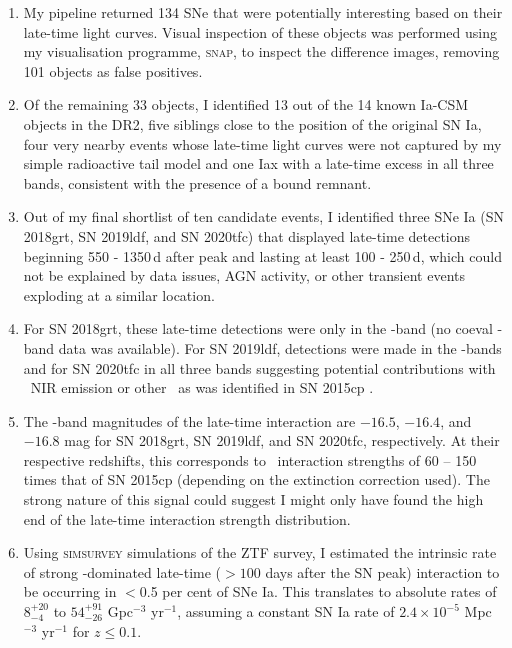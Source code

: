\documentclass[a4paper,oneside,12pt, class=Latex/Classes/PhDthesisPSnPDF, crop=false]{standalone}
\begin{document}
\begin{enumerate}
 \item My pipeline returned 134 SNe that were potentially interesting based on their late-time light curves. Visual inspection of these objects was performed using my visualisation programme, \textsc{snap}, to inspect the difference images, removing 101 objects as false positives. 
 \item Of the remaining 33 objects, I identified 13 out of the 14 known Ia-CSM objects in the DR2, five siblings close to the position of the original SN Ia, four very nearby events whose late-time light curves were not captured by my simple radioactive tail model and one Iax with a late-time excess in all three bands, consistent with the presence of a bound remnant. 
 \item Out of my final shortlist of ten candidate events, I identified three SNe Ia (SN 2018grt, SN 2019ldf, and SN 2020tfc) that displayed late-time detections beginning 550 - 1350\,d after peak and lasting at least 100 - 250\,d, which could not be explained by data issues, AGN activity, or other transient events exploding at a similar location. 
 \item For SN 2018grt, these late-time detections were only in the \ztfr-band (no coeval \ztfi-band data was available). For SN 2019ldf, detections were made in the \ztfr\ztfi-bands and for SN 2020tfc in all three bands suggesting potential contributions with \CaII\ NIR emission or other \MgI\ as was identified in SN 2015cp \citep{2015cp}. 
 \item The \ztfr-band magnitudes of the late-time interaction are $-16.5$, $-16.4$, and $-16.8$ mag for SN 2018grt, SN 2019ldf, and SN 2020tfc, respectively. At their respective redshifts, this corresponds to \Halpha~interaction strengths of 60 -- 150 times that of SN 2015cp (depending on the extinction correction used). The strong nature of this signal could suggest I might only have found the high end of the late-time interaction strength distribution.
 \item Using \textsc{simsurvey} simulations of the ZTF survey, I estimated the intrinsic rate of strong \Halpha-dominated late-time ($>100$ days after the SN peak) interaction to be occurring in $<$0.5 per cent of SNe Ia. This translates to absolute rates of $8_{-4}^{+20}$ to $54_{-26}^{+91}$ Gpc$^{-3}$ yr$^{-1}$, assuming a constant SN Ia rate of $2.4\times10^{-5}$ Mpc$^{-3}$ yr$^{-1}$ for $z \leq 0.1$.
\end{enumerate}
\end{document}
